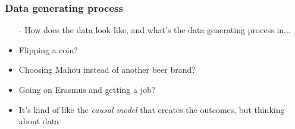 \documentclass[aspectratio=43]{beamer}
\begin{document}
\begin{frame}
\frametitle{Data generating process}
\centering

\begin{itemize}
  \item[-] How does the data look like, and what's the data generating process in...
  \item[]
  \item Flipping a coin?
  \item Choosing Mahou instead of another beer brand?
  \item Going on Erasmus and getting a job?
  \item[]
  \item It's kind of like the \textit{causal model} that creates the outcomes, but thinking about data
\end{itemize}

\end{frame}
\end{document}
